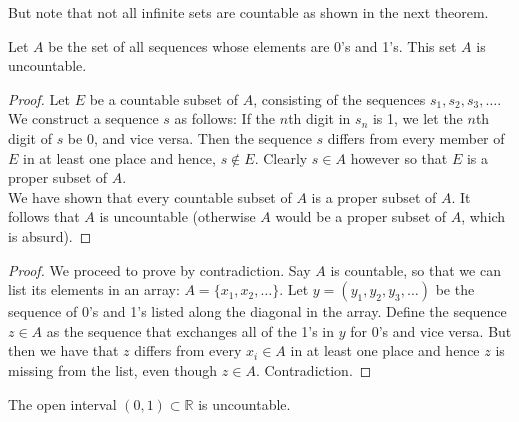 But note that not all infinite sets are countable as shown in the next theorem.

\begin{theorem} Let $A$ be the set of all sequences whose elements are 0's and 1's.  This set $A$ is uncountable. \end{theorem}

\begin{proof}
Let $E$ be a countable subset of $A$, consisting of the sequences $s_1, s_2, s_3, \ldots$.   We construct a sequence $s$ as follows: If the $n$th digit in $s_n$ is 1, we let the $n$th digit of $s$ be 0, and vice versa.  Then the sequence $s$ differs from every member of $E$ in at least one place and hence, $s \notin E$.  Clearly $s \in A$ however so that $E$ is a proper subset of $A$.\\

We have shown that every countable subset of $A$ is a proper subset of $A$.  It follows that $A$ is uncountable (otherwise $A$ would be a proper subset of $A$, which is absurd).
\end{proof}

\begin{proof} 

We proceed to prove by contradiction.  Say $A$ is countable, so that we can list its elements in an array:  $A = \{x_1, x_2, \ldots \}$.  Let $y = (y_1, y_2, y_3, \ldots)$ be the sequence of 0's and 1's listed along the diagonal in the array.   Define the sequence $z \in A$ as the sequence that exchanges all of the 1's in $y$ for 0's and vice versa.  But then we have that $z$ differs from every $x_i \in A$ in at least one place and hence $z$ is missing from the list, even though $z \in A$.  Contradiction.

\end{proof}

\begin{theorem} The open interval $(0,1) \subset \mathbb{R}$ is uncountable.    \end{theorem}


